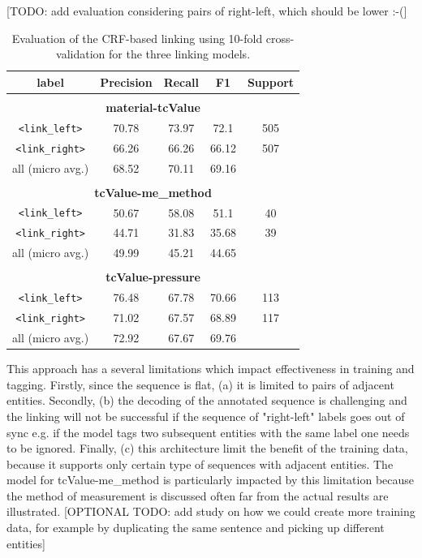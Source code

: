\documentclass{article}
\begin{document}
[TODO: add evaluation considering pairs of right-left, which should be lower :-(]
\begin{table}[ht]
\centering
\begin{tabular}{c c c c c}
\hline 
\textbf{label} & \textbf{Precision} & \textbf{Recall} & \textbf{F1} & \textbf{Support}\\ 
\hline
\multicolumn{5}{c}{} \\
\hline
\multicolumn{5}{c}{\textbf{material-tcValue}} \\
\hline
\texttt{<link\_left>}  & 70.78   & 73.97 & 72.1  & 505    \\
\texttt{<link\_right>} & 66.26   & 66.26 & 66.12 & 507    \\
\hline
all (micro avg.)       & 68.52   & 70.11 & 69.16 &       \\
\multicolumn{5}{c}{} \\
\hline
\multicolumn{5}{c}{\textbf{tcValue-me\_method}} \\
\hline
\texttt{<link\_left>}  & 50.67   & 58.08 & 51.1  & 40    \\
\texttt{<link\_right>} & 44.71   & 31.83 & 35.68 & 39    \\
\hline
all (micro avg.)       & 49.99   & 45.21 & 44.65 &       \\
\multicolumn{5}{c}{} \\
\hline
\multicolumn{5}{c}{\textbf{tcValue-pressure}} \\
\hline
\texttt{<link\_left>}  & 76.48   & 67.78  & 70.66 & 113    \\
\texttt{<link\_right>} & 71.02   & 67.57  & 68.89 & 117    \\
\hline
all (micro avg.)       & 72.92   & 67.67  & 69.76 &       \\
\end{tabular}
\caption{Evaluation of the CRF-based linking using 10-fold cross-validation for the three linking models. }
\label{tab:evaluation-crf-linking-cross-validation}
\end{table}

This approach has a several limitations which impact effectiveness in training and tagging. 
Firstly, since the sequence is flat, (a) it is limited to pairs of adjacent entities. Secondly, (b) the decoding of the annotated sequence is challenging and the linking will not be successful if the sequence of "right-left" labels goes out of sync e.g. if the model tags two subsequent entities with the same label one needs to be ignored. Finally, (c) this architecture limit the benefit of the training data, because it supports only certain type of sequences with adjacent entities. The model for tcValue-me\_method is particularly impacted by this limitation because the method of measurement is discussed often far from the actual results are illustrated. 
[OPTIONAL TODO: add study on how we could create more training data, for example by duplicating the same sentence and picking up different entities]
\end{document}
